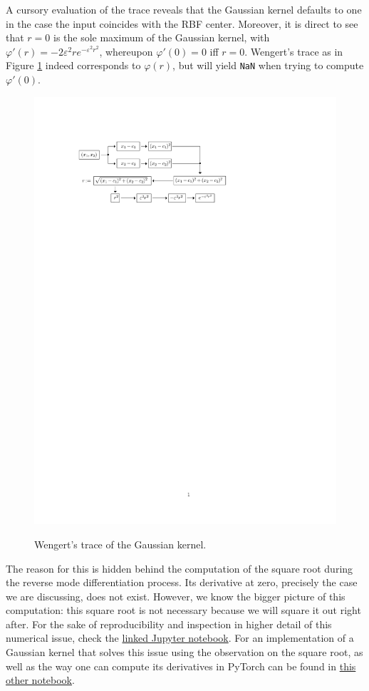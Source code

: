 \documentclass[12pt]{report} %
\begin{document}
A cursory evaluation of the trace reveals that the Gaussian kernel defaults to one in
the case the input coincides with the RBF center. Moreover, it is direct to see that
$r=0$ is the sole maximum of the Gaussian kernel, with $\varphi'(r)=-2 \varepsilon^2 r
  e^{-\varepsilon^2 r^2}$, whereupon $\varphi'(0)=0$ iff $r=0$. Wengert's trace as in Figure \ref{fig:wenger-trace-gaussian}
indeed corresponds to $\varphi(r)$, but will yield \texttt{NaN} when trying to compute
$\varphi'(0)$.

\begin{figure}[ht]
  {\includegraphics[width=.85\textwidth, trim={2cm 22cm 7cm 3cm}, clip=true]{imagenes/rbf_discussion/diagrama-gaussian-wengert.pdf}}
  \caption{Wengert's trace of the Gaussian kernel.}
  \label{fig:wenger-trace-gaussian}
\end{figure}

The reason for this is hidden behind the computation of the square root during the reverse
mode differentiation process. Its derivative at zero, precisely the case we
are discussing, does not exist.
However, we know the bigger picture of this computation: this square root is not
necessary because we will square it out right after. For the sake of reproducibility
and inspection in higher detail of this numerical issue, check the
\href{https://github.com/heqro/tfm-experiments/blob/main/introductory_notebooks/differentials_computation/differentials_rbf_NANs.ipynb}{linked
  Jupyter notebook}. For an implementation of a Gaussian kernel that solves this issue
using the observation on the square root, as well
as the way one can compute its derivatives in PyTorch can be found in
\href{https://github.com/heqro/tfm-experiments/blob/main/introductory_notebooks/differentials_computation/differentials_rbf_NANs_fixed.ipynb}
{this other notebook}.
\end{document}
